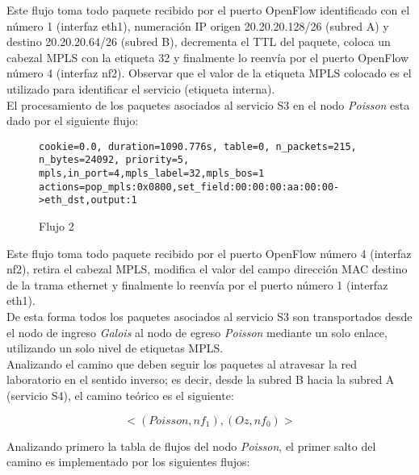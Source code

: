 Este flujo toma todo paquete recibido por el puerto OpenFlow identificado con el n\'umero 1 (interfaz eth1), numeración IP origen 20.20.20.128/26 (subred A) y destino 20.20.20.64/26 (subred B), decrementa el TTL del paquete, coloca un cabezal MPLS con la etiqueta 32 y finalmente lo reenvía por el puerto OpenFlow n\'umero 4 (interfaz nf2). Observar que el valor de la etiqueta MPLS colocado es el utilizado para identificar el servicio (etiqueta interna). \\


El procesamiento de los paquetes asociados al servicio S3 en el nodo \textit{Poisson} esta dado por el siguiente flujo:

\begin{figure}[h]
\texttt{cookie=0.0, duration=1090.776s, table=0, n\_packets=215, \\ 
n\_bytes=24092, priority=5, mpls,in\_port=4,mpls\_label=32,mpls\_bos=1 \\
actions=pop\_mpls:0x0800,set\_field:00:00:00:aa:00:00->eth\_dst,output:1 }
\centering
\caption{Flujo 2}
\label{fig:Flujo2}
\end{figure}

Este flujo toma todo paquete recibido por el puerto OpenFlow n\'umero 4 (interfaz nf2), retira el cabezal MPLS, modifica el valor del campo direcci\'on MAC destino de la trama ethernet y finalmente lo reenvía por el puerto n\'umero 1 (interfaz eth1).\\

De esta forma todos los paquetes asociados al servicio S3 son transportados desde el nodo de ingreso \textit{Galois} al nodo de egreso \textit{Poisson} mediante un solo enlace, utilizando un solo nivel de etiquetas MPLS.\\

Analizando el camino que deben seguir los paquetes al atravesar la red laboratorio en el sentido inverso; es decir, desde la subred B hacia la subred A (servicio S4), el camino teórico es el siguiente:

$$<(Poisson, nf_1), (Oz, nf_0)>$$ 

Analizando primero la tabla de flujos del nodo \textit{Poisson}, el primer salto del camino es implementado por los siguientes flujos:

